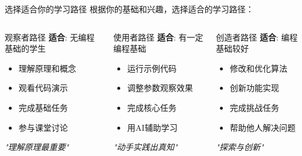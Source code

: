 \begin{frame}{选择适合你的学习路径}
    根据你的基础和兴趣，选择适合的学习路径：

    \begin{columns}[t]
        \begin{block}{观察者路径}
            \textbf{适合}: 无编程基础的学生
            \vspace{0.2cm}
            \begin{itemize}
                \small
                \item 理解原理和概念
                \item 观看代码演示
                \item 完成基础任务
                \item 参与课堂讨论
            \end{itemize}
            \vspace{0.2cm}
            \centering
            \textit{"理解原理最重要"}
        \end{block}

        \begin{block}{使用者路径}
            \textbf{适合}: 有一定编程基础
            \vspace{0.2cm}
            \begin{itemize}
                \small
                \item 运行示例代码
                \item 调整参数观察效果
                \item 完成核心任务
                \item 用AI辅助学习
            \end{itemize}
            \vspace{0.2cm}
            \centering
            \textit{"动手实践出真知"}
        \end{block}

        \begin{block}{创造者路径}
            \textbf{适合}: 编程基础较好
            \vspace{0.2cm}
            \begin{itemize}
                \small
                \item 修改和优化算法
                \item 创新功能实现
                \item 完成挑战任务
                \item 帮助他人解决问题
            \end{itemize}
            \vspace{0.2cm}
            \centering
            \textit{"探索与创新"}
        \end{block}
    \end{columns}


\end{frame}
